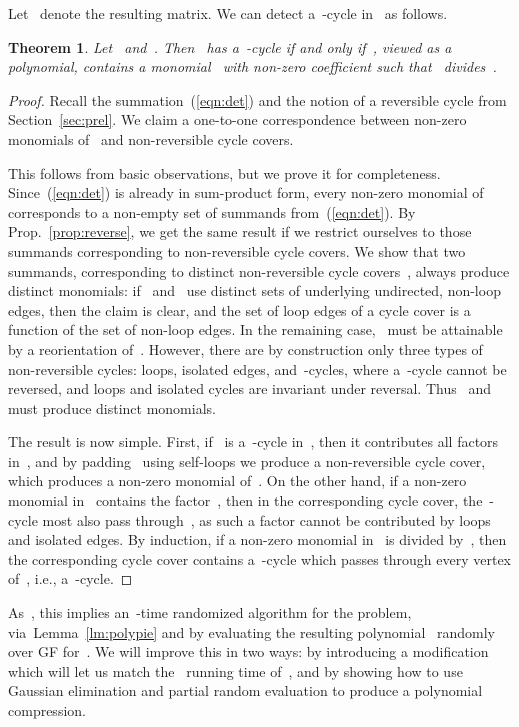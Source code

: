 \documentclass[a4paper,11pt]{article}
\newtheorem{theorem}{Theorem}
\begin{document}
Let~ denote the resulting matrix. We can detect a~-cycle in~ as follows.

\begin{theorem}
\label{th:fourtok}
Let~ and~. Then~ has
a~-cycle if and only if~, viewed as a polynomial, contains a monomial~
with non-zero coefficient such that~ divides~. 
\end{theorem}
\begin{proof}
Recall the summation~(\ref{eqn:det}) and the notion of a reversible cycle from
Section~\ref{sec:prel}. We claim a one-to-one correspondence between non-zero monomials
of~ and non-reversible cycle covers. 

This follows from basic observations, but we prove it for completeness. 
Since~(\ref{eqn:det}) is already in sum-product form, every non-zero monomial of~ corresponds to a non-empty set of summands from~(\ref{eqn:det}). By
Prop.~\ref{prop:reverse}, we get the same result if we restrict ourselves to those
summands corresponding to non-reversible cycle covers. We show that two summands,
corresponding to distinct non-reversible cycle covers~, always produce distinct
monomials: if~ and~ use distinct sets of underlying undirected, non-loop edges,
then the claim is clear, and the set of loop edges of a cycle cover is a function of the
set of non-loop edges. In the remaining case,~ must be attainable by a reorientation of~.
However, there are by construction only three types of non-reversible cycles: loops,
isolated edges, and~-cycles, where a~-cycle cannot be reversed, and loops and
isolated cycles are invariant under reversal. Thus~ and~ must produce distinct
monomials. 

The result is now simple. First, if~ is a~-cycle in~, then it contributes all
factors in~, and by padding~ using self-loops we produce a non-reversible cycle
cover, which produces a non-zero monomial of~. On the other hand, if a non-zero
monomial in~ contains the factor~, then in the
corresponding cycle cover, the~-cycle most also pass through~, as such a
factor cannot be contributed by loops and isolated edges.  By induction, if a non-zero
monomial in~ is divided by~, then the corresponding cycle cover contains
a~-cycle which passes through every vertex of~, i.e., a~-cycle. 
\end{proof}

As~, this implies an~-time randomized algorithm for the problem,
via~Lemma~\ref{lm:polypie} and by evaluating the resulting polynomial~ randomly over
GF for~. We will improve this in two ways: by
introducing a modification which will let us match the~ running time
of~\cite{BjorklundHT12}, and by showing how to use Gaussian elimination and partial random
evaluation to produce a polynomial compression. 
\end{document}
